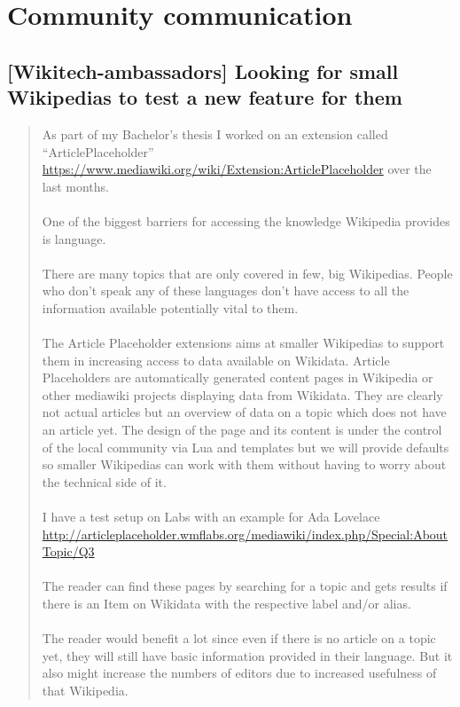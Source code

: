 \section{Community communication} \label{community}

\subsection{[Wikitech-ambassadors] Looking for small Wikipedias to test a new feature for them}
\begin{quote}
As part of my Bachelor’s thesis I worked on an extension called “ArticlePlaceholder” \url{https://www.mediawiki.org/wiki/Extension:ArticlePlaceholder} over the last months. \\
\\
One of the biggest barriers for accessing the knowledge Wikipedia provides is language. \\
\\
There are many topics that are only covered in few, big Wikipedias. People who don’t speak any of these languages don’t have access to all the information available potentially vital to them. \\
\\
The Article Placeholder extensions aims at smaller Wikipedias to support them in increasing access to data available on Wikidata. Article Placeholders are automatically generated content pages in Wikipedia or other mediawiki projects displaying data from Wikidata. They are clearly not actual articles but an overview of data on a topic which does not have an article yet. The design of the page and its content is under the control of the local community via Lua and templates but we will provide defaults so smaller Wikipedias can work with them without having to worry about the technical side of it. \\
\\
I have a test setup on Labs with an example for Ada Lovelace \url{http://articleplaceholder.wmflabs.org/mediawiki/index.php/Special:AboutTopic/Q3} \\
\\
The reader can find these pages by searching for a topic and gets results if there is an Item on Wikidata with the respective label and/or alias. \\
\\
The reader would benefit a lot since even if there is no article on a topic yet, they will still have basic information provided in their language. But it also might increase the numbers of editors due to increased usefulness of that Wikipedia. \\

\end{quote}
